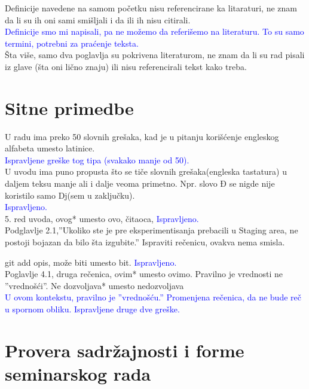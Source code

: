 \documentclass[a4paper]{report}
\newcommand{\odgovor}[1]{\textcolor{blue}{#1}}
\begin{document}
Definicije navedene na samom početku nisu referencirane ka litaraturi, ne znam da li su ih oni sami smišljali i da ili ih nisu citirali. \\
\odgovor{Definicije smo mi napisali, pa ne možemo da referišemo na literaturu. To su samo termini, potrebni za praćenje teksta.}\\
Šta više, samo dva poglavlja su pokrivena literaturom, ne znam da li su rad pisali iz glave (šta oni lično znaju) ili nisu referencirali tekst kako treba. \\

\section{Sitne primedbe}
U radu ima preko 50 slovnih grešaka, kad je u pitanju korišćenje engleskog alfabeta umesto latinice.\\
\odgovor{Ispravljene greške tog tipa (svakako manje od 50).}\\
U uvodu ima puno propusta što se tiče slovnih grešaka(engleska tastatura) u daljem teksu manje ali i dalje veoma primetno. Npr. slovo Đ se nigde nije koristilo samo Dj(sem u zaključku).\\
\odgovor{Ispravljeno.}\\
5. red uvoda, ovog* umesto ovo, čitaoca,\newline
\odgovor{Ispravljeno.}\\
Podglavlje 2.1,''Ukoliko ste je pre eksperimentisanja prebacili u Staging area, ne postoji bojazan da bilo šta izgubite.'' Ispraviti rečenicu, ovakva nema smisla.\newline


git add opis, može biti umesto bit.\newline
\odgovor{Ispravljeno.}\\
Poglavlje 4.1, druga rečenica, ovim* umesto ovimo. Pravilno je vrednosti ne ''vrednošći''. Ne dozvoljava* umesto nedozvoljava\\
\odgovor{U ovom kontekstu, pravilno je ''vrednošću.'' Promenjena rečenica, da ne bude reč u spornom obliku. Ispravljene druge dve greške.}\\



\section{Provera sadržajnosti i forme seminarskog rada}
\end{document}
